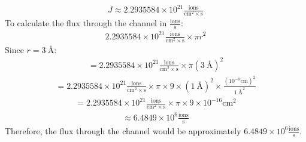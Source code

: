 \documentclass[11pt]{article}
\begin{document}
\begin{enumerate}[label=\arabic*.]
\begin{enumerate}[label=\Alph*.]
\begin{enumerate}[label=\arabic*.]
\begin{align*}
\end{align*}
\begin{align*}
J \approx 2.2935584 \times 10 ^ {21} \frac{\text{ions}} {\text{cm} ^ {2} \times \text{s}}
\end{align*}
To calculate the flux through the channel in $\frac{\text{ions}} {\text{s}}$:
\begin{align*}
2.2935584 \times 10 ^ {21} \frac{\text{ions}} {\text{cm} ^ {2} \times \text{s}} \times \pi r ^ 2
\end{align*}
Since $r = \SI{3}{\angstrom}$:
\begin{align*}
= 2.2935584 \times 10 ^ {21} \frac{\text{ions}} {\text{cm} ^ {2} \times \text{s}} \times \pi \left(\SI{3}{\angstrom}\right) ^ 2
\end{align*}
\begin{align*}
= 2.2935584 \times 10 ^ {21} \frac{\text{ions}} {\text{cm} ^ {2} \times \text{s}} \times \pi \times 9 \times \left(\SI{1}{\angstrom}\right) ^ 2 \times \frac{\left(10 ^ {-8} \text{cm}\right) ^ 2} {\SI{1}{\angstrom} ^ 2}
\end{align*}
\begin{align*}
= 2.2935584 \times 10 ^ {21} \frac{\text{ions}} {\text{cm} ^ {2} \times \text{s}} \times \pi \times 9 \times 10 ^ {-16} \text{cm} ^ {2}
\end{align*}
\begin{align*}
\approx 6.4849 \times 10 ^ 6 \frac{\text{ions}} {\text{s}}
\end{align*}
Therefore, the flux through the channel would be approximately $6.4849 \times 10 ^ 6 \frac{\text{ions}} {\text{s}}$.




\end{enumerate}
\end{enumerate}
\end{enumerate}
\end{document}
